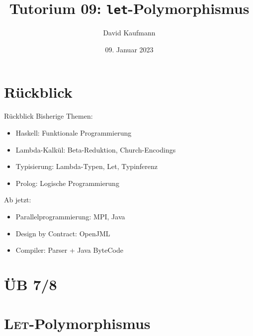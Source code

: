 \documentclass{beamer}
\title{Tutorium 09: \texttt{let}-Polymorphismus}
\author{David Kaufmann}
\institute{Tutorium Programmierparadigmen am KIT}
\date{09. Januar 2023}
\begin{document}
\begin{frame}
    \titlepage
\end{frame}

\section{Rückblick}

\begin{frame}{Rückblick}
    Bisherige Themen:

    \begin{itemize}
        \item Haskell: Funktionale Programmierung
        \item Lambda-Kalkül: Beta-Reduktion, Church-Encodings
        \item Typisierung: Lambda-Typen, Let, Typinferenz
        \item Prolog: Logische Programmierung
    \end{itemize}

    Ab jetzt:

    \begin{itemize}
        \item Parallelprogrammierung: MPI, Java
        \item Design by Contract: OpenJML
        \item Compiler: Parser + Java ByteCode
    \end{itemize}
\end{frame}

\section{ÜB 7/8}

\section{\textsc{Let}-Polymorphismus}
\end{document}
